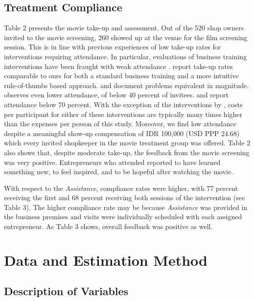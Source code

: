 \documentclass[11.5pt]{article}
\begin{document}
\subsection{Treatment Compliance}

Table 2 presents the movie take-up and assessment. Out of the 520 shop owners invited to the movie screening, 260 showed up at the venue for the film screening session. This is in line with previous experiences of low take-up rates for interventions requiring attendance. In particular, evaluations of business training interventions have been fraught with weak attendance \citep[for a review, see][]{McKenzie2014}. \citet{Drexler2014} report take-up rates comparable to ours for both a standard business training and a more intuitive rule-of-thumbs based approach. \citet{Gine2014} and \citet{Bruhn2017} document problems equivalent in magnitude. \citet{Bruhn2013} observes even lower attendance, of below 40 percent of invitees. \citet{Calderon2013} and \citet{Premand2016} report attendance below 70 percent. With the exception of the interventions by \citet{Drexler2014}, costs per participant for either of these interventions are typically many times higher than the expenses per person of this study. Moreover, we find low attendance despite a meaningful show-up compensation of IDR 100,000 (USD PPP 24.68) which every invited shopkeeper in the movie treatment group was offered. %
Table 2 also shows that, despite moderate take-up, the feedback from the movie screening was very positive. Entrepreneurs who attended reported to have learned something new, to feel inspired, and to be hopeful after watching the movie.

With respect to the \emph{Assistance}, compliance rates were higher, with 77 percent receiving the first and 68 percent receiving both sessions of the intervention (see Table 3). The higher compliance rate may be because \emph{Assistance} was provided in the business premises and visits were individually scheduled with each assigned entrepreneur. As Table 3 shows, overall feedback was positive as well.

\section{Data and Estimation Method}\label{sec.data}

\subsection{Description of Variables}
\end{document}
